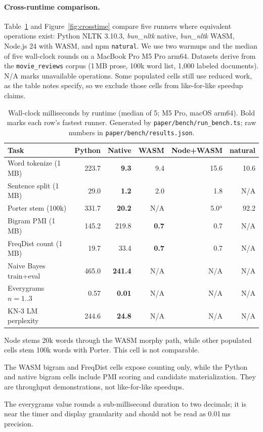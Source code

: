 \documentclass[pdflatex,sn-mathphys-num]{sn-jnl}
\theoremstyle{thmstyleone}
\begin{document}
\paragraph{Cross-runtime comparison.}
Table~\ref{tab:crosstime} and Figure~\ref{fig:crosstime} compare five runners where equivalent operations exist: Python NLTK 3.10.3, \emph{bun\_nltk} native, \emph{bun\_nltk} WASM, Node.js 24 with WASM, and npm \texttt{natural}. We use two warmups and the median of five wall-clock rounds on a MacBook Pro M5 Pro arm64. Datasets derive from the \texttt{movie\_reviews} corpus (1\,MB prose, 100k word list, 1{,}000 labeled documents). N/A marks unavailable operations. Some populated cells still use reduced work, as the table notes specify, so we exclude those cells from like-for-like speedup claims.

\begin{table}[!htbp]
\centering
\caption{Wall-clock milliseconds by runtime (median of 5; M5 Pro, macOS arm64). Bold marks each row's fastest runner. Generated by \texttt{paper/bench/run\_bench.ts}; raw numbers in \texttt{paper/bench/results.json}.}
\label{tab:crosstime}
\begin{tabular}{@{}l r r r r r@{}}
\toprule
Task & Python & Native & WASM & Node+WASM & natural \\
\midrule
Word tokenize (1\,MB)        & 223.7 & \textbf{9.3}   & 9.4   & 15.6  & 10.6 \\
Sentence split (1\,MB)       & 29.0  & \textbf{1.2}   & 2.0   & 1.8   & N/A \\
Porter stem (100k)           & 331.7 & \textbf{20.2}  & N/A   & 5.0$^{a}$ & 92.2 \\
Bigram PMI (1\,MB)           & 145.2 & 219.8          & \textbf{0.7}   & 0.7   & N/A \\
FreqDist count (1\,MB)       & 19.7  & 33.4           & \textbf{0.7}   & 0.7   & N/A \\
Naive Bayes train+eval       & 465.0 & \textbf{241.4} & N/A   & N/A   & N/A \\
Everygrams $n{=}1..3$        & 0.57  & \textbf{0.01}  & N/A   & N/A   & N/A \\
KN-3 LM perplexity           & 244.6 & \textbf{24.8}  & N/A   & N/A   & N/A \\
\bottomrule
\end{tabular}
\begin{tablenotes}\footnotesize
\item[$^{a}$] Node stems 20k words through the WASM morphy path, while other populated cells stem 100k words with Porter. This cell is not comparable.
\item[] The WASM bigram and FreqDist cells expose counting only, while the Python and native bigram cells include PMI scoring and candidate materialization. They are throughput demonstrations, not like-for-like speedups.
\item[] The everygrams value rounds a sub-millisecond duration to two decimals; it is near the timer and display granularity and should not be read as 0.01\,ms precision.
\end{tablenotes}
\end{table}
\end{document}
